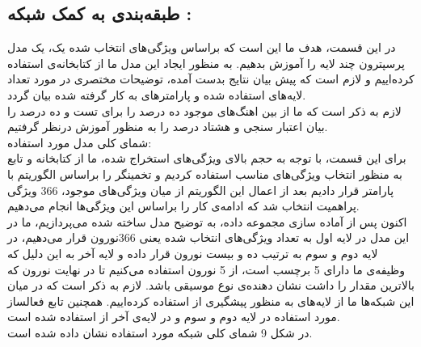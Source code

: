 \documentclass[10pt,onecolumn,a4paper]{article}
\begin{document}
\subsection{طبقه‌بندی به کمک شبکه :}

در این قسمت، هدف ما این است که براساس ویژگی‌های انتخاب شده یک، یک مدل پرسپترون چند لایه را آموزش بدهیم. به منظور ایجاد این مدل ما از کتابخانه‌ی  استفاده کرده‌اییم و لازم است که پیش بیان نتایج بدست آمده، توضیحات مختصری در مورد تعداد لایه‌های استفاده شده و پارامترهای به کار گرفته شده بیان گردد.\\
لازم به ذکر است که ما از بین اهنگ‌های موجود ده درصد را برای تست و ده درصد را بیان اعتبار سنجی و هشتاد درصد را به منظور آموزش درنظر گرفتیم. \\
		شمای کلی مدل مورد استفاده: \\
    برای این قسمت، با توجه به حجم بالای ویژگی‌های استخراج شده، ما از کتابخانه  و تابع  به منظور انتخاب ویژگی‌های مناسب استفاده کردیم و تخمینگر را براساس الگوریتم  با پارامتر   قرار دادیم بعد از اعمال این الگوریتم از میان ویژگی‌های موجود، 366 ویژگی پراهمیت انتخاب شد که ادامه‌ی کار را براساس این ویژگی‌ها انجام می‌دهیم. \\

اکنون پس از آماده سازی مجموعه داده، به توضیح مدل ساخته شده می‌پردازیم، ما در این مدل در لایه اول به تعداد ویژگی‌های انتخاب شده یعنی 366نورون قرار می‌دهیم، در لایه دوم و سوم به ترتیب ده و بیست نورون قرار داده و لایه آخر به این دلیل که وظیفه‌ی ما دارای 5 برچسب است، از 5 نورون استفاده می‌کنیم تا در نهایت نورون که بالاترین مقدار را داشت نشان دهنده‌ی نوع موسیقی باشد. لازم به ذکر است که در میان این شبکه‌ها ما از لایه‌های   به منظور پیشگیری از  استفاده کرده‌اییم. همچنین تابع فعالساز مورد استفاده در لایه دوم و سوم   و در لایه‌ی آخر از   استفاده شده است.\\ 
در شکل 9 شمای کلی شبکه مورد استفاده نشان داده شده است.\\
  
\end{document}

